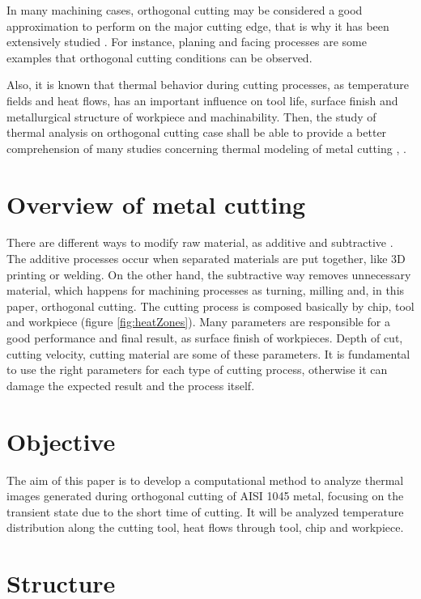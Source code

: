 	In many machining cases, orthogonal cutting may be considered a good approximation to perform on the major cutting edge, that is why it has been extensively studied \cite{shaw2005metal}. For instance, planing and facing processes are some examples that orthogonal cutting conditions can be observed.

	Also, it is known that thermal behavior during cutting processes, as temperature fields and heat flows, has an important influence on tool life, surface finish and metallurgical structure of workpiece and machinability. Then, the study of thermal analysis on orthogonal cutting case shall be able to provide a better comprehension of many studies concerning thermal modeling of metal cutting \cite{komanduri2000thermal}, \cite{komanduri2001thermal}.
	
	\section{Overview of metal cutting}
	
	There are different ways to modify raw material, as additive and subtractive \cite{shaw2005metal}. The additive processes occur when separated materials are put together, like 3D printing or welding. On the other hand, the subtractive way removes unnecessary material, which happens for machining processes as turning, milling and, in this paper, orthogonal cutting. The cutting process is composed basically by chip, tool and workpiece (figure \ref{fig:heatZones}).
	Many parameters are responsible for a good performance and final result, as surface finish of workpieces. Depth of cut, cutting velocity, cutting material are some of these parameters. It is fundamental to use the right parameters for each type of cutting process, otherwise it can damage the expected result and the process itself.
	
	\section{Objective}

	The aim of this paper is to develop a computational method to analyze thermal images generated during orthogonal cutting of AISI 1045 metal, focusing on the transient state due to the short time of cutting. It will be analyzed temperature distribution along the cutting tool, heat flows through tool, chip and workpiece.

	\section{Structure}
	
